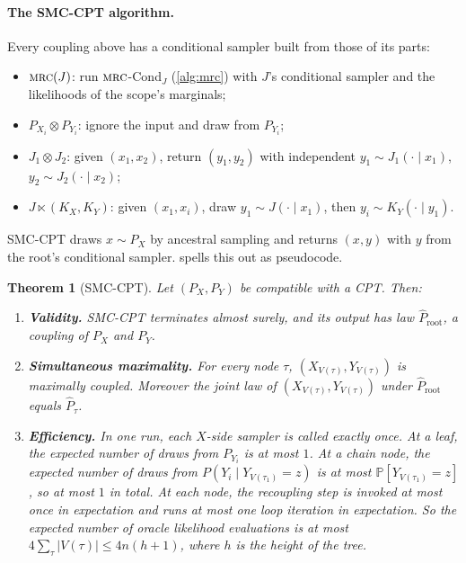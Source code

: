 \documentclass[11pt]{article}
\newtheorem{theorem}{Theorem}[section]
\theoremstyle{definition}
\newcommand{\hP}{\hat P}
\newcommand{\MRC}{\textnormal{\textsc{mrc}}}
\newcommand{\Var}{V}
\renewcommand{\Pr}{\mathbb{P}}
\begin{document}
\paragraph{The SMC-CPT algorithm.}
Every coupling above has a conditional sampler built from those of its parts:
\begin{itemize}
  \item $\MRC(J)$: run $\MRC$-Cond$_J$ (\cref{alg:mrc}) with $J$'s conditional sampler and the likelihoods of the scope's marginals;
  \item $P_{X_i}\otimes P_{Y_i}$: ignore the input and draw from $P_{Y_i}$;
  \item $J_1\otimes J_2$: given $(x_1,x_2)$, return $(y_1,y_2)$ with independent $y_1\sim J_1(\cdot\mid x_1)$, $y_2\sim J_2(\cdot\mid x_2)$;
  \item $J\ltimes(K_X,K_Y)$: given $(x_1,x_i)$, draw $y_1\sim J(\cdot\mid x_1)$, then $y_i\sim K_Y(\cdot\mid y_1)$.
\end{itemize}
SMC-CPT draws $x\sim P_X$ by ancestral sampling and returns $(x,y)$ with $y$ from
the root's conditional sampler.  spells this out as
pseudocode.

\begin{theorem}[SMC-CPT]\label{thm:cpt}
Let $(P_X,P_Y)$ be compatible with a CPT. Then:
\begin{enumerate}[label=(\alph*)]
  \item \textbf{Validity.} SMC-CPT terminates almost surely, and its output has law $\hP_{\mathrm{root}}$, a coupling of $P_X$ and $P_Y$.
  \item \textbf{Simultaneous maximality.} For every node $\tau$, $(X_{\Var(\tau)},Y_{\Var(\tau)})$ is maximally coupled. Moreover the joint law of $(X_{\Var(\tau)},Y_{\Var(\tau)})$ under $\hP_{\mathrm{root}}$ equals $\hP_\tau$.
  \item \textbf{Efficiency.} In one run, each $X$-side sampler is called exactly once. At a leaf, the expected number of draws from $P_{Y_i}$ is at most $1$. At a chain node, the expected number of draws from $P(Y_i\mid Y_{\Var(\tau_1)}=z)$ is at most $\Pr[Y_{\Var(\tau_1)}=z]$, so at most $1$ in total. At each node, the recoupling step is invoked at most once in expectation and runs at most one loop iteration in expectation. So the expected number of oracle likelihood evaluations is at most $4\sum_\tau|\Var(\tau)|\le 4n(h+1)$, where $h$ is the height of the tree.
\end{enumerate}
\end{theorem}
\end{document}

